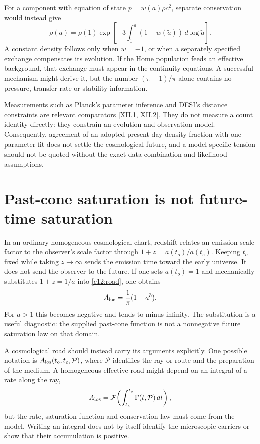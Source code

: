 For a component with equation of state $p=w(a)\rho c^2$, separate conservation would instead give
\begin{equation}
 \rho(a)=\rho(1)\exp\left[-3\int_1^a(1+w(\widetilde a))
                                      \,d\log\widetilde a\right].
 \label{c12:darkenergy}
\end{equation}
A constant density follows only when $w=-1$, or when a separately specified exchange compensates its evolution. If the Home population feeds an effective background, that exchange must appear in the continuity equations. A successful mechanism might derive it, but the number $(\pi-1)/\pi$ alone contains no pressure, transfer rate or stability information.

Measurements such as Planck's parameter inference and DESI's distance constraints are relevant comparators [XII.1, XII.2]. They do not measure a count identity directly: they constrain an evolution and observation model. Consequently, agreement of an adopted present-day density fraction with one parameter fit does not settle the cosmological future, and a model-specific tension should not be quoted without the exact data combination and likelihood assumptions.

\section{Past-cone saturation is not future-time saturation}
In an ordinary homogeneous cosmological chart, redshift relates an emission scale factor to the observer's scale factor through $1+z=a(t_o)/a(t_e)$. Keeping $t_o$ fixed while taking $z\to\infty$ sends the emission time toward the early universe. It does not send the observer to the future. If one sets $a(t_o)=1$ and mechanically substitutes $1+z=1/a$ into \eqref{c12:road}, one obtains
\begin{equation}
 A_{\rm los}=\frac1\pi(1-a^3).
 \label{c12:badextension}
\end{equation}
For $a>1$ this becomes negative and tends to minus infinity. The substitution is a useful diagnostic: the supplied past-cone function is not a nonnegative future saturation law on that domain.

A cosmological road should instead carry its arguments explicitly. One possible notation is $A_{\rm los}(t_o,t_e,\mathcal P)$, where $\mathcal P$ identifies the ray or route and the preparation of the medium. A homogeneous effective road might depend on an integral of a rate along the ray,
\begin{equation}
 A_{\rm los}=\mathcal F\!\left(\int_{t_e}^{t_o}
                        \Gamma(t,\mathcal P)\,dt\right),
 \label{c12:roadfunctional}
\end{equation}
but the rate, saturation function and conservation law must come from the model. Writing an integral does not by itself identify the microscopic carriers or show that their accumulation is positive.

